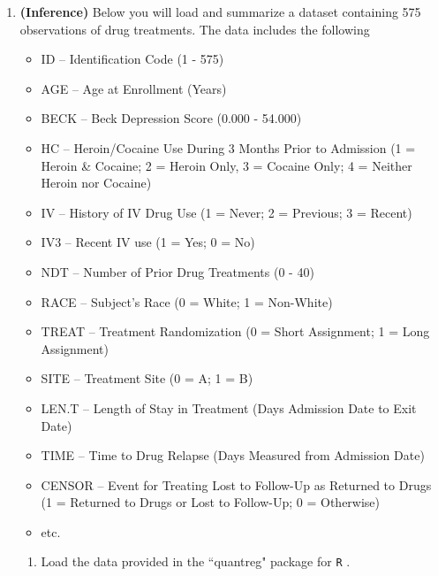 \documentclass{article}
\begin{document}
\begin{enumerate}
\newpage
\item \textbf{(Inference)} Below you will load and summarize a dataset 
  containing 575 observations of drug treatments. The data includes the following
  \begin{itemize}
    \item ID --	Identification Code	(1 - 575)
    \item AGE	-- Age at Enrollment	(Years)
    \item BECK -- Beck Depression Score	(0.000 - 54.000)
    \item HC --	Heroin/Cocaine Use During	3 Months Prior to Admission (1 = Heroin
    \& Cocaine; 2 = Heroin Only, 3 = Cocaine Only; 4 = Neither Heroin nor Cocaine)
    \item IV -- History of IV Drug Use	(1 = Never; 2 = Previous; 3 = Recent)
    \item IV3	-- Recent IV use	(1 = Yes; 0 = No)
    \item NDT -- Number of Prior Drug Treatments (0 - 40)
    \item RACE -- Subject's Race	(0 = White; 1 = Non-White)
    \item TREAT -- Treatment Randomization (0 = Short Assignment;	1 = Long Assignment)
    \item SITE -- Treatment Site (0 = A; 1 = B)
    \item LEN.T	-- Length of Stay in Treatment (Days Admission Date to Exit Date)	
    \item TIME -- Time to Drug Relapse (Days Measured from Admission Date)
    \item CENSOR -- Event for Treating Lost to Follow-Up as Returned to Drugs 
    (1 = Returned to Drugs or Lost to Follow-Up; 0 = Otherwise)
    \item etc.
  \end{itemize}
  \begin{enumerate} %
    \item Load the data provided in the ``quantreg" package for \texttt{R} \citep{quantreg}.
\begin{Schunk}
\begin{Sinput}

\end{Sinput}
\end{Schunk}
\end{enumerate}
\end{enumerate}
\end{document}

